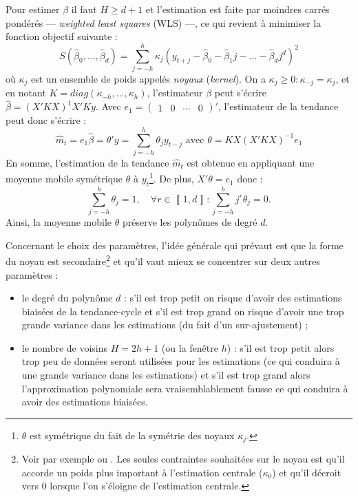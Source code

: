 \documentclass[
  11pt,
  french,
  a4paper]{article}
\newcommand\1{\mathds{1}}
\begin{document}
Pour estimer \(\beta\) il faut \(H\geq d+1\) et l'estimation est faite par moindres carrés pondérés --- \emph{weighted least squares} (WLS) ---, ce qui revient à minimiser la fonction objectif suivante :
\[
S(\hat{\beta}_{0},\dots,\hat{\beta}_{d})=\sum_{j=-h}^{h}\kappa_{j}(y_{t+j}-\hat{\beta}_{0}-\hat{\beta}_{1}j-\dots-\hat{\beta}_{d}j^{d})^{2}
\]
où \(\kappa_j\) est un ensemble de poids appelés \emph{noyaux} (\emph{kernel}).
On a \(\kappa_j\geq 0:\kappa_{-j}=\kappa_j\), et en notant \(K=diag(\kappa_{-h},\dots,\kappa_{h})\), l'estimateur \(\beta\) peut s'écrire \(\hat{\beta}=(X'KX)^{1}X'Ky\).
Avec \(e_{1}=\begin{pmatrix}1&0&\cdots&0\end{pmatrix}'\), l'estimateur de la tendance peut donc s'écrire :
\[
\hat{m}_{t}=e_{1}\hat{\beta}=\theta'y=\sum_{j=-h}^{h}\theta_{j}y_{t-j}\text{ avec }\theta=KX(X'KX)^{-1}e_{1}
\]
En somme, l'estimation de la tendance \(\hat{m}_{t}\) est obtenue en appliquant une moyenne mobile symétrique \(\theta\) à \(y_t\)\footnote{
  \(\theta\) est symétrique du fait de la symétrie des noyaux \(\kappa_j\).}.
De plus, \(X'\theta=e_{1}\) donc :
\[
\sum_{j=-h}^{h}\theta_{j}=1,\quad\forall r\in\left\llbracket 1,d\right\rrbracket :\sum_{j=-h}^{h}j^{r}\theta_{j}=0.
\]
Ainsi, la moyenne mobile \(\theta\) préserve les polynômes de degré \(d\).

Concernant le choix des paramètres, l'idée générale qui prévaut est que la forme du noyau est secondaire\footnote{
  Voir par exemple \textcite{cleveland1996smoothing} ou \textcite{Loader1999}.
  Les seules contraintes souhaitées sur le noyau est qu'il accorde un poids plus important à l'estimation centrale (\(\kappa_0\)) et qu'il décroit vers 0 lorsque l'on s'éloigne de l'estimation centrale.} et qu'il vaut mieux se concentrer sur deux autres paramètres :

\begin{itemize}
\item
  le degré du polynôme \(d\) : s'il est trop petit on risque d'avoir des estimations biaisées de la tendance-cycle et s'il est trop grand on risque d'avoir une trop grande variance dans les estimations (du fait d'un sur-ajustement) ;
\item
  le nombre de voisins \(H=2h+1\) (ou la fenêtre \(h\)) : s'il est trop petit alors trop peu de données seront utilisées pour les estimations (ce qui conduira à une grande variance dans les estimations) et s'il est trop grand alors l'approximation polynomiale sera vraisemblablement fausse ce qui conduira à avoir des estimations biaisées.
\end{itemize}
\end{document}
